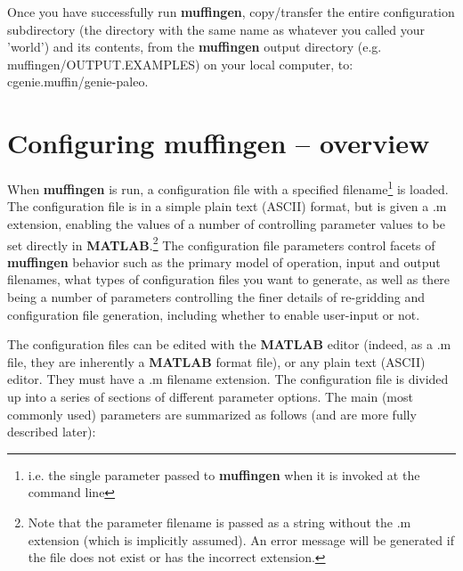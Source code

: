\documentclass[11pt,fleqn]{book} %
\begin{document}
Once you have successfully run \textbf{muffingen}, copy/transfer the entire  configuration subdirectory (the directory with the same name as whatever you called your 'world')  and its contents, from the \textbf{muffingen} output directory (e.g. \textsf{\small muffingen/OUTPUT.EXAMPLES}) on your local computer, to: \textsf{\footnotesize cgenie.muffin/genie-paleo}.


\newpage

\section{Configuring muffingen -- overview}


When \textbf{muffingen} is run, a configuration file with a specified filename\footnote{i.e. the single parameter passed to \textbf{muffingen} when it is invoked at the command line} is loaded. The configuration file is in a simple plain text (ASCII) format, but is given a \textsf{.m} extension, enabling the values of a number of controlling parameter values to be set directly in \textbf{MATLAB}.\footnote{Note that the parameter filename is passed as a string without the .m extension (which is implicitly assumed). An error message will be generated if the file does not exist or has the incorrect extension.} The configuration file parameters control facets of \textbf{muffingen} behavior such as the primary model of operation, input and output filenames, what types of configuration files you want to generate, as well as there being a number of parameters controlling the finer details of re-gridding and configuration file generation, including whether to enable user-input or not.

The configuration files can be edited with the \textbf{MATLAB} editor (indeed, as a \textsf{\small .m} file, they are inherently a \textbf{MATLAB} format file), or any plain text (ASCII) editor. They must have a \textsf{\small .m} filename extension. 
The configuration file is divided up into a series of sections of different parameter options. The main (most commonly used) parameters are summarized as follows (and are more fully described later):
\end{document}
